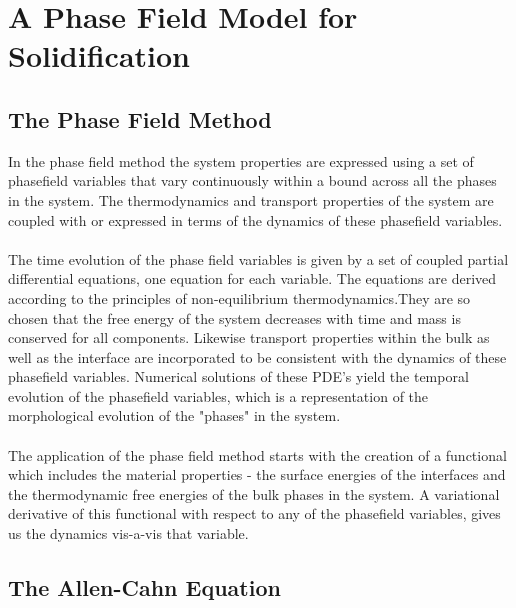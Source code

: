 \documentclass[12pt,a4paper]{report}
\begin{document}
\chapter{A Phase Field Model for Solidification}

\section{The Phase Field Method}

In the phase field method the system properties are expressed using a set of phasefield variables 
that vary continuously within a bound across all the phases in the system. The thermodynamics and 
transport properties of the system are coupled with or expressed in terms of the dynamics of these 
phasefield variables.\\
\\
The time evolution of the phase field variables is given by a set of coupled partial differential 
equations, one equation for each variable. The equations are derived according to the principles of 
non-equilibrium thermodynamics.They are so chosen that the free energy of the system decreases with 
time and mass is conserved for all components. Likewise transport properties within the bulk as well as 
the interface are incorporated to be consistent with the dynamics of these phasefield variables. 
Numerical solutions of these PDE's yield the temporal evolution of the phasefield variables, which is 
a representation of the morphological evolution of the "phases" in the system.\\
\\
The application of the phase field method starts with the creation of a functional which includes the 
material properties - the surface energies of the interfaces and the thermodynamic free energies 
of the bulk phases in the system. A variational derivative of this functional with respect to any of the 
phasefield variables, gives us the dynamics vis-a-vis that variable.\\


\section{The Allen-Cahn Equation}
\end{document}
